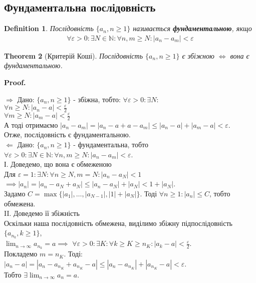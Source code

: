 \documentclass[a4paper, 14pt]{article}
\makeatletter
\def\huge{\displaystyle}
\def\qed{$\blacksquare$}
\def\rightproof{$\boxed{\Rightarrow}$ }
\def\leftproof{$\boxed{\Leftarrow}$ }
\theoremstyle{theoremdd}
\newtheorem{theorem}{Theorem}[subsection]
\theoremstyle{theoremdd}
\newtheorem{definition}[theorem]{Definition}
\theoremstyle{theoremdd}
\theoremstyle{theoremdd}
\theoremstyle{theoremdd}
\theoremstyle{theoremdd}
\theoremstyle{theoremdd}
\theoremstyle{theoremdd}
\renewenvironment{proof}[1][Proof.\\]{\par
\pushQED{\hfill \qed}%
\normalfont \topsep6\p@\@plus6\p@\relax
\trivlist
\item\relax
{\bfseries
#1\@addpunct{.}}\hspace\labelsep\ignorespaces
}{%
\popQED\endtrivlist\@endpefalse
}
\makeatother
\begin{document}
	\subsection{Фундаментальна послідовність}
	\begin{definition}
	Послідовність $\{a_n, n \geq 1\}$ називається \textbf{фундаментальною}, якщо
	\begin{align*}
	\forall \varepsilon > 0: \exists N \in \mathbb{N}: \forall n,m \geq N: |a_n - a_m| < \varepsilon
	\end{align*}
	\end{definition}
	
	\begin{theorem}[Критерій Коші]
	Послідовність $\{a_n, n \geq 1\}$ є збіжною $\iff$ вона є фундаментальною.
	\end{theorem}
	
	\begin{proof}
	\rightproof Дано: $\{a_n,n \geq 1\}$ - збіжна, тобто: $\forall \varepsilon >0: \exists N: $\\
	$\huge \forall n \geq N: |a_n - a| < \frac{\varepsilon}{2}$\\
	$\huge \forall m \geq N: |a_m - a| < \frac{\varepsilon}{2}$\\
	А тоді отримаємо $|a_n - a_m| = |a_n - a + a - a_m| \leq |a_n - a| + |a_m - a| < \varepsilon$.\\
	Отже, послідовність є фундаментальною.
	\bigskip \\
	
	\leftproof Дано: $\{a_n, n \geq 1\}$ - фундаментальна, тобто $\forall \varepsilon > 0: \exists N \in \mathbb{N}: \forall n,m \geq N: |a_n - a_m| < \varepsilon$.\\
	І. Доведемо, що вона є обмеженою\\
	Для $\varepsilon = 1: \exists N: \forall n \geq N, m = N: |a_n - a_N| < 1$\\
	$\implies |a_n| = |a_n - a_N + a_N| \leq |a_n - a_N| + |a_N| < 1 + |a_N|$.\\
	Задамо $C = \max\{|a_1|, \dots, |a_{N-1}|, |1|+|a_N|\}$. Тоді $\forall n \geq 1: |a_n| \leq C$, тобто обмежена.
	\bigskip \\
	II. Доведемо її збіжність\\
	Оскільки наша послідовність обмежена, виділимо збіжну підпослідовність $\{a_{n_k}, k \geq 1\}$, \\ $\huge \lim_{n \to \infty} a_{n_k} = a \implies$
	$\huge \forall \varepsilon > 0: \exists K: \forall k \geq K \geq n_K: |a_{k} - a| < \frac{\varepsilon}{2}$.\\
	Покладемо $m = n_K$. Тоді:\\
	$|a_n - a| = |a_n - a_{n_K} + a_{n_K} - a| \leq |a_n - a_{n_K}| + |a_{n_K} - a| < \varepsilon$.\\
	Тобто $\huge \exists \lim_{n \to \infty} a_n = a$.
	\end{proof}
	
\end{document}
